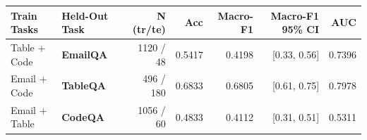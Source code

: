 \begin{tabular}{llrrrrr}
\toprule
\textbf{Train Tasks} & \textbf{Held-Out Task} & \textbf{N (tr/te)} & \textbf{Acc} & \textbf{Macro-F1} & \textbf{Macro-F1 95\% CI} & \textbf{AUC} \\
\midrule
Table + Code & \textbf{EmailQA} & 1120 / 48 & 0.5417 & 0.4198 & [0.33, 0.56] & 0.7396 \\
Email + Code & \textbf{TableQA} & 496 / 180 & 0.6833 & 0.6805 & [0.61, 0.75] & 0.7978 \\
Email + Table & \textbf{CodeQA} & 1056 / 60 & 0.4833 & 0.4112 & [0.31, 0.51] & 0.5311 \\
\bottomrule
\end{tabular}
